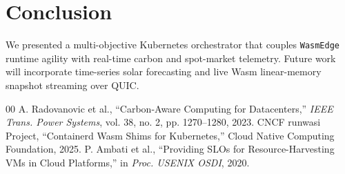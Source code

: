 \documentclass[conference]{IEEEtran}
\begin{document}
\section{Conclusion}
We presented a multi-objective Kubernetes orchestrator that couples \texttt{WasmEdge} runtime agility with real-time carbon and spot-market telemetry. Future work will incorporate time-series solar forecasting and live Wasm linear-memory snapshot streaming over QUIC.

\begin{thebibliography}{00}
 A. Radovanovic et al., ``Carbon-Aware Computing for Datacenters,'' \textit{IEEE Trans. Power Systems}, vol. 38, no. 2, pp. 1270--1280, 2023.
 CNCF runwasi Project, ``Containerd Wasm Shims for Kubernetes,'' Cloud Native Computing Foundation, 2025.
 P. Ambati et al., ``Providing SLOs for Resource-Harvesting VMs in Cloud Platforms,'' in \textit{Proc. USENIX OSDI}, 2020.
\end{thebibliography}
\end{document}
